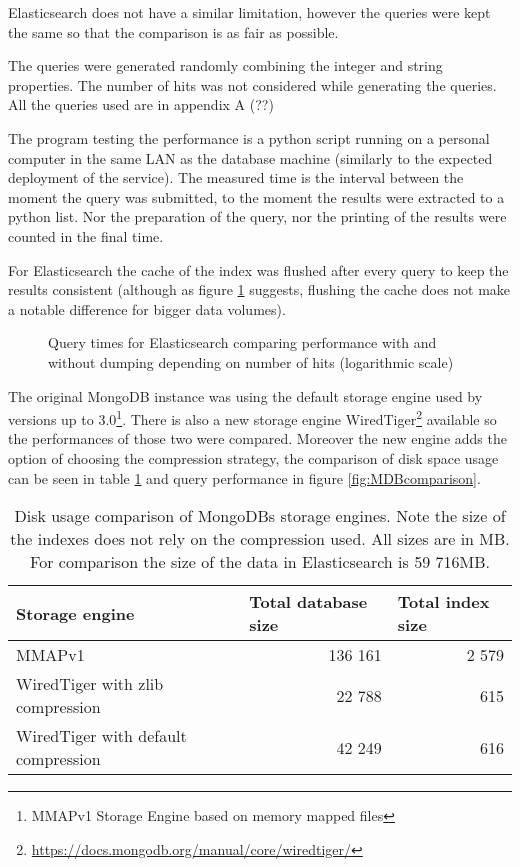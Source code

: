 Elasticsearch does not have a similar limitation, however the queries were kept
the same so that the comparison is as fair as possible. 

The queries were generated randomly combining the integer and string properties. The number of hits was not 
considered while generating the queries. All the queries used are in appendix A (??)%

The program testing the performance is a python script running on a personal computer in the same LAN as the 
database machine (similarly to the expected deployment of the service). The measured time is the interval between 
the moment the query was submitted, to the moment the results were extracted to a python list. Nor the 
preparation of the query, nor the printing of the results were counted in the final time. 

For Elasticsearch the cache of the index was flushed after every query to keep the results consistent (although as 
figure \ref{fig:EScache} suggests, flushing the cache does not make a notable difference for bigger data volumes). 

\begin{figure}[t]
	\centering
	
	\caption{Query times for Elasticsearch comparing performance with and without dumping depending on number of 
	hits (logarithmic scale)}
	\label{fig:EScache}
\end{figure}

The original MongoDB instance was using the default storage engine used by versions up to 3.0\footnote{MMAPv1 
Storage Engine based on memory mapped files}. There is also a new storage engine WiredTiger\footnote{
\url{https://docs.mongodb.org/manual/core/wiredtiger/}} available so the performances of those two were compared.
Moreover the new engine adds the option of choosing the compression strategy, the comparison of disk space usage 
can be seen in table \ref{tab:MongoComp} and query performance in figure \ref{fig:MDBcomparison}.

\begin{table}[]
\centering
\label{tab:MongoComp}
\begin{tabular}{|l|r|r|}
\hline
Storage engine                      & \multicolumn{1}{l|}{Total database size} & \multicolumn{1}{l|}{Total index size} \\ \hline
MMAPv1                              & 136 161                                  & 2 579                                 \\ \hline
WiredTiger with zlib compression    & 22 788                                   & 615                                   \\ \hline
WiredTiger with default compression & 42 249                                   & 616                                   \\ \hline
\end{tabular}
\caption{Disk usage comparison of MongoDBs storage engines. Note the size of the indexes does not rely on the
compression used. All sizes are in MB. For comparison the size of the data in Elasticsearch is 59 716MB.}
\end{table}


